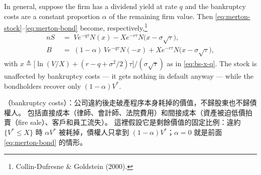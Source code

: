 \suppend


In general, suppose the firm has a dividend yield at rate $q$ and the bankruptcy costs are a constant proportion $\alpha$ of the remaining firm value.
Then \eqref{eq:merton-stock}--\eqref{eq:merton-bond} become, respectively,\footnote{Collin-Dufresne \& Goldstein (2000).}
\begin{align*}
	nS & \;=\; Ve^{-q\tau}N(x)-Xe^{-r\tau}N\bigl(x-\sigma\sqrt{\tau}\bigr) ,                \\
	B  & \;=\; (1-\alpha)\,Ve^{-q\tau}N(-x)+Xe^{-r\tau}N\bigl(x-\sigma\sqrt{\tau}\bigr) ,
\end{align*}
with $x\triangleq\bigl[\ln(V/X)+(r-q+\sigma^{2}/2)\tau\bigr]/(\sigma\sqrt{\tau})$ as in \eqref{eq:bs-x-q}.
\suppstart
The stock is unaffected by bankruptcy costs --- it gets nothing in default anyway --- while the bondholders recover only $(1-\alpha)V^{*}$.


\begin{remark}
	（bankruptcy costs）：公司違約後走破產程序本身耗掉的價值，不歸股東也不歸債權人。
	包括直接成本（律師、會計師、法院費用）和間接成本（資產被迫低價拍賣（fire sale）、客戶和員工流失）。
	這裡假設它是剩餘價值的固定比例：違約 $\{V^{*}\le X\}$ 時 $\alpha V^{*}$ 被耗掉，債權人只拿到 $(1-\alpha)V^{*}$；$\alpha=0$ 就是前面 \eqref{eq:merton-bond} 的情形。
\end{remark}

